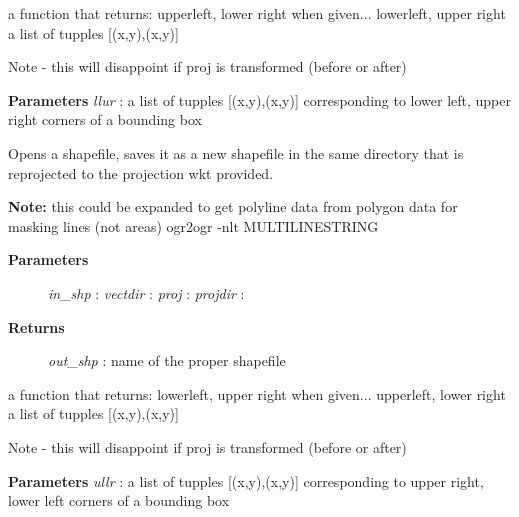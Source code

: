 \documentclass[letterpaper,10pt,english]{sphinxmanual}
\begin{document}

\begin{fulllineitems}
\label{code:Util.llur2ullr}
a function that returns:
upperleft, lower right when given...
lowerleft, upper right
a list of tupples {[}(x,y),(x,y){]}

Note - this will disappoint if proj is transformed (before or after)

\textbf{Parameters}
\emph{llur} : a list of tupples {[}(x,y),(x,y){]} corresponding to lower left, upper right corners of a bounding box

\end{fulllineitems}


\begin{fulllineitems}
\label{code:Util.reprojSHP}
Opens a shapefile, saves it as a new shapefile in the same directory
that is reprojected to the projection wkt provided.

\textbf{Note:} this could be expanded to get polyline data from polygon data
for masking lines (not areas) ogr2ogr -nlt MULTILINESTRING
\begin{description}
\item[{\textbf{Parameters}}] \leavevmode
\emph{in\_shp}    :
\emph{vectdir}   :
\emph{proj}      :
\emph{projdir}   :

\item[{\textbf{Returns}}] \leavevmode
\emph{out\_shp}   :   name of the proper shapefile

\end{description}

\end{fulllineitems}


\begin{fulllineitems}
\label{code:Util.ullr2llur}
a function that returns:
lowerleft, upper right when given...
upperleft, lower right
a list of tupples {[}(x,y),(x,y){]}

Note - this will disappoint if proj is transformed (before or after)

\textbf{Parameters}
\emph{ullr} : a list of tupples {[}(x,y),(x,y){]} corresponding to upper right, lower left corners of a bounding box

\end{fulllineitems}
\end{document}
